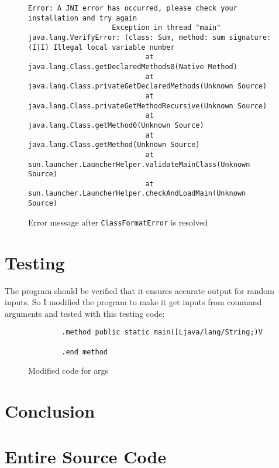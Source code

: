 \documentclass[a4paper, 12pt]{article}
\begin{document}
            \begin{figure}[H]
                \begin{lstlisting}[gobble=20]
                    Error: A JNI error has occurred, please check your installation and try again
                    Exception in thread "main" java.lang.VerifyError: (class: Sum, method: sum signature: (I)I) Illegal local variable number
                            at java.lang.Class.getDeclaredMethods0(Native Method)
                            at java.lang.Class.privateGetDeclaredMethods(Unknown Source)
                            at java.lang.Class.privateGetMethodRecursive(Unknown Source)
                            at java.lang.Class.getMethod0(Unknown Source)
                            at java.lang.Class.getMethod(Unknown Source)
                            at sun.launcher.LauncherHelper.validateMainClass(Unknown Source)
                            at sun.launcher.LauncherHelper.checkAndLoadMain(Unknown Source)
                \end{lstlisting}
        
                \centering        
                \caption{Error message after \texttt{ClassFormatError} is resolved}
            \end{figure}
    \section{Testing}
    The program should be verified that it ensures accurate output for random inputs. So I modified the program to make it get inputs from command arguments and tested with this testing code:
    \begin{figure}[H]
        \begin{lstlisting}
        .method public static main([Ljava/lang/String;)V
            
        .end method
        \end{lstlisting}

        \centering        
        \caption{Modified code for args}
    \end{figure}

    \section{Conclusion}


    \section{Entire Source Code}
\end{document}
